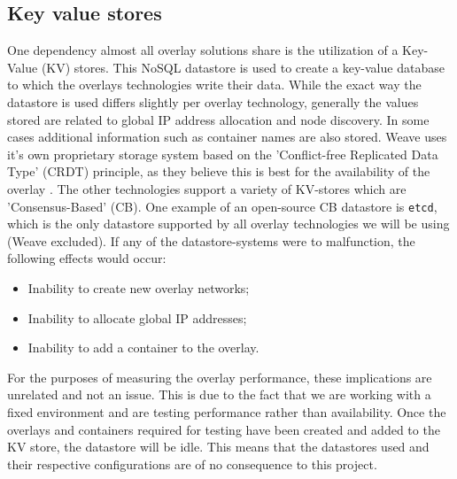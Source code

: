 \subsection{Key value stores}
One dependency almost all overlay solutions share is the utilization of a Key-Value (KV) stores. This NoSQL datastore is used to create a key-value database to which the overlays technologies write their data. While the exact way the datastore is used differs slightly per overlay technology, generally the values stored are related to global IP address allocation and node discovery. In some cases additional information such as container names are also stored. Weave uses it's own proprietary storage system based on the 'Conflict-free Replicated Data Type' (CRDT) principle, as they believe this is best for the availability of the overlay \cite{7_richardson_2015}. The other technologies support a variety of KV-stores which are 'Consensus-Based' (CB). One example of an open-source CB datastore is \texttt{etcd}, which is the only datastore supported by all overlay technologies we will be using (Weave excluded). If any of the datastore-systems were to malfunction, the following effects would occur:

\begin{itemize}
  \item Inability to create new overlay networks;
  \item Inability to allocate global IP addresses;
  \item Inability to add a container to the overlay.
\end{itemize}

For the purposes of measuring the overlay performance, these implications are unrelated and not an issue. This is due to the fact that we are working with a fixed environment and are testing performance rather than availability.
Once the overlays and containers required for testing have been created and added to the KV store, the datastore will be idle. This means that the datastores used and their respective configurations are of no consequence to this project.




